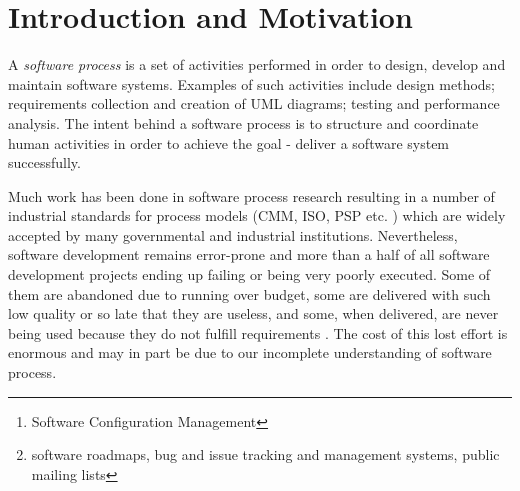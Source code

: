 \documentclass{sig-alternate}
\begin{document}
\begin{abstract}
A process defines a set of routines which allow to organize, manage and improve activities to reach a goal. With an expert intuition and a-priori knowledge software processes were modeled for the long time resulting in Waterfall, Spiral and other development models. Later, with a wide use of SCM \footnote{Software Configuration Management} systems and public availability of primitive software process artifact trails \footnote{software roadmaps, bug and issue tracking and management systems, public mailing lists}, formal methods such as Petri Nets, State Machines and others were applied for recurrent processes discovery and control. Recent advances in metrication effort, increased use of continuous integration and extensive documentation of the performed process make information-rich fine-grained software process artifacts trails available for analysis. Potentially this fine-grained data may shed more light on the software process. In this work I propose to investigate an automated technique for the discovery and characterization of recurrent behaviors in software development - ``programming habits'' either on an individual or a team level.
\end{abstract}




\section{Introduction and Motivation}
A \textit{software process} is a set of activities performed in order to design, develop and maintain software systems. Examples of such activities include design methods; requirements collection and creation of UML diagrams; testing and performance analysis. The intent behind a software process is to structure and coordinate human activities in order to achieve the goal - deliver a software system successfully. 

Much work has been done in software process research resulting in a number of industrial standards for process models (CMM, ISO, PSP etc. \cite{citeulike:5043104}) which are widely accepted by many governmental and industrial institutions. Nevertheless, software development remains error-prone and more than a half of all software development projects ending up failing or being very poorly executed. Some of them are abandoned due to running over budget, some are delivered with such low quality or so late that they are useless, and some, when delivered, are never being used because they do not fulfill requirements \cite{citeulike:7351135}. The cost of this lost effort is enormous and may in part be due to our incomplete understanding of software process.
\end{document}
